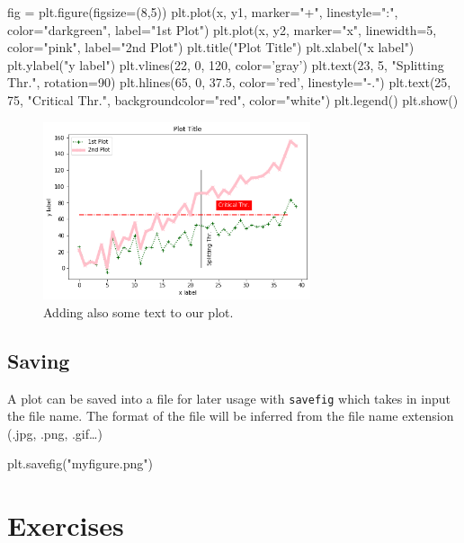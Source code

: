 \begin{ipythonnon}
fig = plt.figure(figsize=(8,5))
plt.plot(x, y1, marker="+", linestyle=":", color="darkgreen", label="1st Plot")
plt.plot(x, y2, marker="x", linewidth=5, color="pink", label="2nd Plot")
plt.title("Plot Title")
plt.xlabel("x label")
plt.ylabel("y label")
plt.vlines(22, 0, 120, color='gray')
plt.text(23, 5, "Splitting Thr.", rotation=90)
plt.hlines(65, 0, 37.5, color='red', linestyle="-.")
plt.text(25, 75, "Critical Thr.", backgroundcolor="red", color="white")
plt.legend()
plt.show()
\end{ipythonnon}

\begin{figure}[htb]
	\centering
	\includegraphics[width=0.7\textwidth]{figures/text}
	\caption{Adding also some text to our plot.}
	\label{fig:text}
\end{figure}

\subsection{Saving}\label{saving}

A plot can be saved into a file for later usage with \texttt{savefig} which takes in input the file name. The format of the file will be inferred from the file name extension (.jpg, .png, .gif\ldots)

\begin{ipythonnon}
plt.savefig("myfigure.png")
\end{ipythonnon}

\section*{Exercises}

